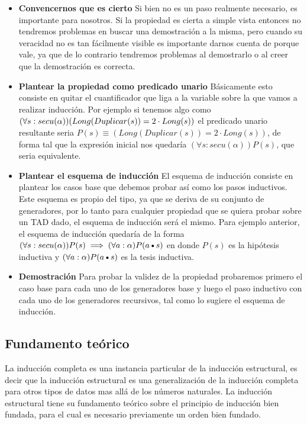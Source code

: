 \documentclass[10pt, a4paper]{report}
\begin{document}
\begin{itemize}
 \item \textbf{Convencernos que es cierto} Si bien no es un paso realmente necesario, es importante para nosotros. Si la propiedad es cierta a simple vista entonces no tendremos problemas en buscar una demostraci\'on a la misma, pero cuando su veracidad no es tan f\'acilmente visible es importante darnos cuenta de porque vale, ya que de lo contrario tendremos problemas al demostrarlo o al creer que la demostraci\'on es correcta.
 \item \textbf{Plantear la propiedad como predicado unario} B\'asicamente esto consiste en quitar el cuantificador que liga a la variable sobre la que vamos a realizar inducci\'on. Por ejemplo si tenemos algo como $(\forall s: secu(\alpha))\\ (Long(Duplicar(s)) = 2 \cdot Long(s))$ el predicado unario resultante seria $P(s) \equiv (Long(Duplicar(s)) = 2 \cdot Long(s))$, de forma tal que la expresi\'on inicial nos quedar\'ia $(\forall s: secu(\alpha)) P(s)$, que seria equivalente.
 \item \textbf{Plantear el esquema de inducci\'on} El esquema de inducci\'on consiste en plantear los casos base que debemos probar as\'i como los pasos inductivos. Este esquema es propio del tipo, ya que se deriva de su conjunto de generadores, por lo tanto para cualquier propiedad que se quiera probar sobre un TAD dado, el esquema de inducci\'on ser\'a el mismo. Para ejemplo anterior, el esquema de inducci\'on quedar\'ia de la forma $(\forall s: secu(\alpha)) P(s) \implies (\forall a: \alpha) P(a \text{\textbullet} s)$ en donde $P(s)$ es la hip\'otesis inductiva y $(\forall a: \alpha) P(a \text{\textbullet} s)$ es la tesis inductiva.
 \item \textbf{Demostraci\'on} Para probar la validez de la propiedad probaremos primero el caso base para cada uno de los generadores base y luego el paso inductivo con cada uno de los generadores recursivos, tal como lo sugiere el esquema de inducci\'on.
\end{itemize}


\subsection{Fundamento te\'orico}

La inducci\'on completa es una instancia particular de la inducci\'on estructural, es decir que la inducci\'on estructural es una generalizaci\'on de la inducci\'on completa para otros tipos de datos mas all\'a de los n\'umeros naturales. La inducci\'on estructural tiene su fundamento te\'orico sobre el principio de inducci\'on bien fundada, para el cual es necesario previamente un orden bien fundado.
\end{document}
